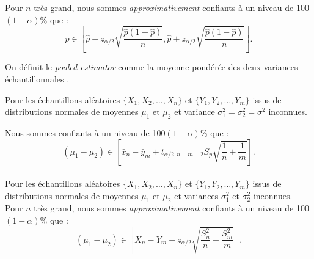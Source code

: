 \documentclass[10pt, french]{article}
\begin{document}
\begin{multicols*}{2}
\begin{definitionNOHFILLsub}
Pour $n$ très grand, nous sommes \textit{approximativement} confiants à un niveau de 100$(1 - \alpha)$\% que :
\begin{equation*}
	p \in \left[ \hat{p} - z_{\alpha/2} \sqrt{\frac{\hat{p}(1 - \hat{p})}{n}}, \hat{p} + z_{\alpha/2} \sqrt{\frac{\hat{p}(1 - \hat{p})}{n}}\right].
\end{equation*}
\end{definitionNOHFILLsub}

On définit le \og \textit{pooled estimator} \fg{} comme la moyenne pondérée des deux variances échantillonnales .\\


\begin{definitionNOHFILLsub}
Pour les échantillons aléatoires $\{X_{1}, X_{2}, \dots, X_{n}\}$ et $\{Y_{1}, Y_{2}, \dots, Y_{m}\}$ issus de distributions normales de moyennes $\mu_{1}$ et $\mu_{2}$ et variance $\sigma^{2}_{1} = \sigma^{2}_{2} = \sigma^{2}$ inconnues.

Nous sommes confiants à un niveau de 100$(1 - \alpha)$\% que :
\begin{equation*}
	(\mu_{1}	-	\mu_{2}) \in \left[ 
	\bar{x}_{n}	-	\bar{y}_{m}
	\pm	t_{\alpha/2, n + m - 2} S_{p}\sqrt{\frac{1}{n} + \frac{1}{m}} \right].
\end{equation*}
\begin{align*}
\end{align*}
\end{definitionNOHFILLsub}

\begin{definitionNOHFILLsub}
Pour les échantillons aléatoires $\{X_{1}, X_{2}, \dots, X_{n}\}$ et $\{Y_{1}, Y_{2}, \dots, Y_{m}\}$ issus de distributions normales de moyennes $\mu_{1}$ et $\mu_{2}$ et variances $\sigma^{2}_{1}$ et $\sigma^{2}_{2}$ inconnues.\\

Pour $n$ très grand, nous sommes \textit{approximativement} confiants à un niveau de 100$(1 - \alpha)$\% que :
\begin{equation*}
	(\mu_{1}	-	\mu_{2}) \in \left[ 
	\bar{X}_{n}	-	\bar{Y}_{m}
	\pm	z_{\alpha/2} \sqrt{\frac{S_{n}^{2}}{n} + \frac{S_{m}^{2}}{m}} \right].
\end{equation*}
\begin{align*}
\end{align*}
\end{definitionNOHFILLsub}


\end{multicols*}
\end{document}
